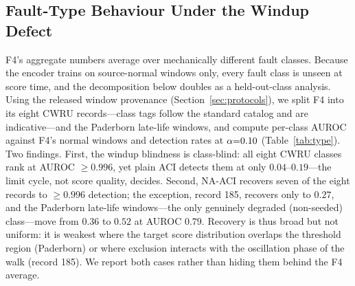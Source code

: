 \begin{table}[t]
\caption{Extremal behaviour at $\alphaNom{=}0.10$ (mean of 3 seeds, in windows): longest alarm-free stretch (sil.), longest consecutive missed-anomaly stretch (miss), and P95 detection delay over anomaly runs. NA-ACI shortens both blind extremes; F2/F5 delays are not detection claims (below-chance ranking).}
\label{tab:extremal}
\centering
\small
{}
\end{table}

\subsection{Fault-Type Behaviour Under the Windup Defect}
\label{sec:fault-type}
F4's aggregate numbers average over mechanically different fault classes. Because the encoder trains on source-normal windows only, every fault class is unseen at score time, and the decomposition below doubles as a held-out-class analysis. Using the released window provenance (Section~\ref{sec:protocols}), we split F4 into its eight CWRU records---class tags follow the standard catalog and are indicative---and the Paderborn late-life windows, and compute per-class AUROC against F4's normal windows and detection rates at $\alphaNom{=}0.10$ (Table~\ref{tab:type}). Two findings. First, the windup blindness is class-blind: all eight CWRU classes rank at AUROC $\geq 0.996$, yet plain ACI detects them at only $0.04$--$0.19$---the limit cycle, not score quality, decides. Second, NA-ACI recovers seven of the eight records to $\geq 0.996$ detection; the exception, record 185, recovers only to $0.27$, and the Paderborn late-life windows---the only genuinely degraded (non-seeded) class---move from $0.36$ to $0.52$ at AUROC $0.79$. Recovery is thus broad but not uniform: it is weakest where the target score distribution overlaps the threshold region (Paderborn) or where exclusion interacts with the oscillation phase of the walk (record 185). We report both cases rather than hiding them behind the F4 average.

